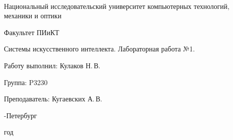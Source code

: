 \thispagestyle{empty}

\onecolumn
\begin{center}
	\
\vspace{1 cm}

\huge Национальный исследовательский университет компьютерных технологий, механики и оптики
\vspace{0.5cm}

\Huge Факультет ПИиКТ


\vspace{5cm}
\huge Системы искусственного интеллекта. Лабораторная работа №1.
\vspace{0.2cm}

\end{center}
\vspace{6 cm}

\begin{flushright}
\Large

Работу выполнил: Кулаков Н.\,В.
\smallskip

Группа: P3230
\smallskip

Преподаватель: Кугаевских А.\,В.
\smallskip

\vspace{4cm}
	
-Петербург

 год
\end{flushright}
